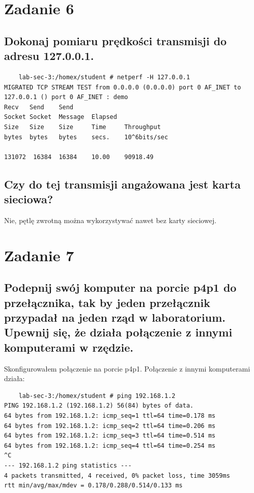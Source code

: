 \documentclass[polish, a4paper]{article}
\begin{document}
\section{Zadanie 6}
\subsection{Dokonaj pomiaru prędkości transmisji do adresu 127.0.0.1.}
\begin{verbatim}
    lab-sec-3:/homex/student # netperf -H 127.0.0.1
MIGRATED TCP STREAM TEST from 0.0.0.0 (0.0.0.0) port 0 AF_INET to 127.0.0.1 () port 0 AF_INET : demo
Recv   Send    Send                          
Socket Socket  Message  Elapsed              
Size   Size    Size     Time     Throughput  
bytes  bytes   bytes    secs.    10^6bits/sec  

131072  16384  16384    10.00    90918.49 
\end{verbatim}

\subsection{Czy do tej transmisji angażowana jest karta sieciowa?}
Nie, pętlę zwrotną można wykorzystywać nawet bez karty sieciowej.

\section{Zadanie 7 }
\subsection{Podepnij swój komputer na porcie p4p1 do przełącznika, tak
by jeden przełącznik przypadał na jeden rząd w laboratorium.
Upewnij się, że działa połączenie z innymi komputerami w
rzędzie.}

Skonfigurowałem połączenie na porcie p4p1. Połączenie z innymi komputerami działa:

\begin{verbatim}
    lab-sec-3:/homex/student # ping 192.168.1.2
PING 192.168.1.2 (192.168.1.2) 56(84) bytes of data.
64 bytes from 192.168.1.2: icmp_seq=1 ttl=64 time=0.178 ms
64 bytes from 192.168.1.2: icmp_seq=2 ttl=64 time=0.206 ms
64 bytes from 192.168.1.2: icmp_seq=3 ttl=64 time=0.514 ms
64 bytes from 192.168.1.2: icmp_seq=4 ttl=64 time=0.254 ms
^C
--- 192.168.1.2 ping statistics ---
4 packets transmitted, 4 received, 0% packet loss, time 3059ms
rtt min/avg/max/mdev = 0.178/0.288/0.514/0.133 ms

\end{verbatim}
\end{document}
